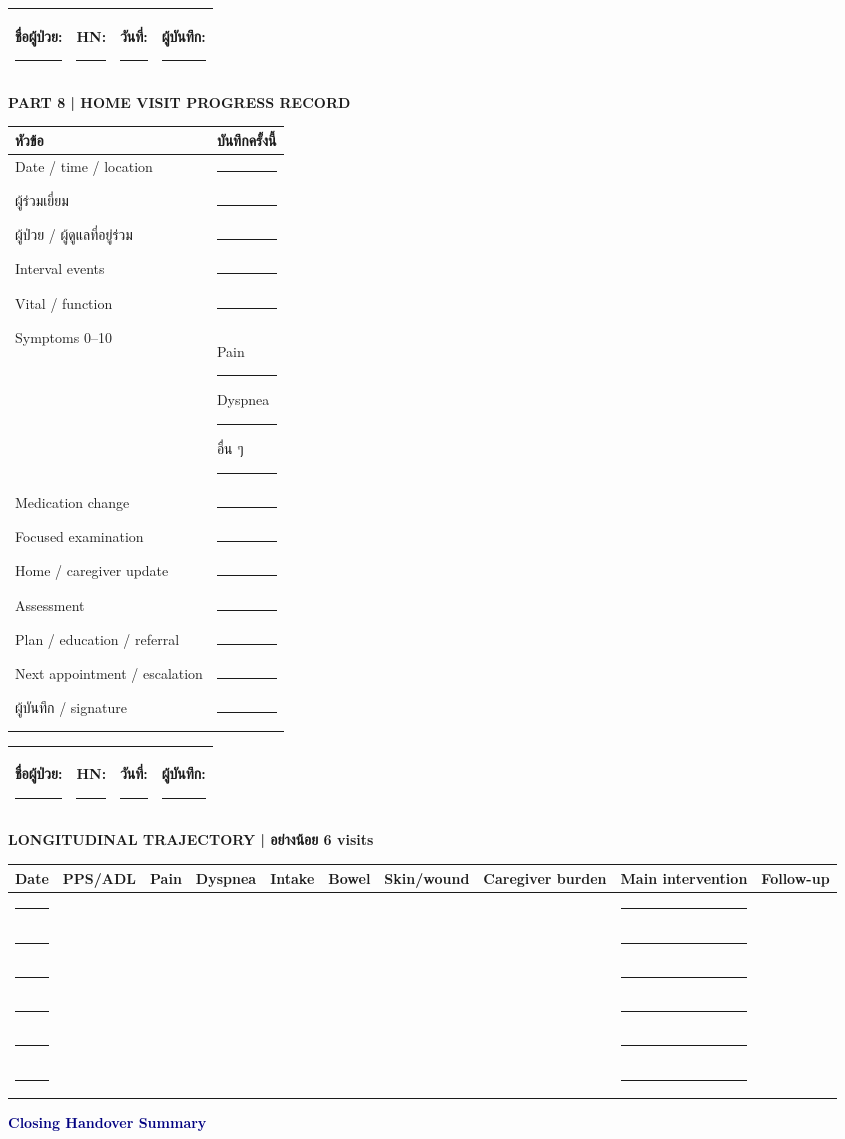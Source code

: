 \documentclass[12pt,a4paper]{article}
\newlength{\blanklen}
\newcommand{\blank}[1][4cm]{\setlength{\blanklen}{#1}\ifdim\blanklen>2cm\setlength{\blanklen}{2cm}\fi\rule{\blanklen}{0.4pt}}
\newcommand{\patientline}{\begin{tabularx}{\textwidth}{|X|X|X|X|}\hline ชื่อผู้ป่วย: \blank[2.8cm] & HN: \blank[1.4cm] & วันที่: \blank[1.4cm] & ผู้บันทึก: \blank[1.5cm]\\\hline\end{tabularx}\vspace{3pt}}
\newcommand{\sectiontitle}[1]{\vspace{4pt}\begin{tcolorbox}[colback=navy,colframe=navy,boxrule=0pt,arc=1pt,left=5pt,right=5pt,top=3pt,bottom=3pt]\color{white}\large\textbf{#1}\end{tcolorbox}}
\newcommand{\sub}[1]{\par\vspace{3pt}\noindent\textcolor{navy}{\large\textbf{#1}}\par\vspace{1pt}}
\newcommand{\lines}[1]{\begin{tcolorbox}[colback=white,colframe=gray!55,boxrule=0.4pt,arc=1pt,height=#1]\ \end{tcolorbox}}
\begin{document}
\newpage\patientline\sectiontitle{PART 8 | HOME VISIT PROGRESS RECORD}\begin{tabularx}{\textwidth}{|p{}|X|}\hline\rowcolor{navy}\color{white}หัวข้อ&\color{white}บันทึกครั้งนี้\\\hline Date / time / location&\blank[10cm]\\\hline ผู้ร่วมเยี่ยม&\blank[10cm]\\\hline ผู้ป่วย / ผู้ดูแลที่อยู่ร่วม&\blank[10cm]\\\hline Interval events&\blank[10cm]\\\hline Vital / function&\blank[10cm]\\\hline Symptoms 0--10&Pain \blank[1cm] Dyspnea \blank[1cm] อื่น ๆ \blank[4cm]\\\hline Medication change&\blank[10cm]\\\hline Focused examination&\blank[10cm]\\\hline Home / caregiver update&\blank[10cm]\\\hline Assessment&\blank[10cm]\\\hline Plan / education / referral&\blank[10cm]\\\hline Next appointment / escalation&\blank[10cm]\\\hline ผู้บันทึก / signature&\blank[10cm]\\\hline\end{tabularx}
\newpage\patientline\sectiontitle{LONGITUDINAL TRAJECTORY | อย่างน้อย 6 visits}\small\begin{tabularx}{\textwidth}{|c|c|c|c|c|c|c|c|X|c|}\hline\rowcolor{navy}\color{white}Date&\color{white}PPS/ADL&\color{white}Pain&\color{white}Dyspnea&\color{white}Intake&\color{white}Bowel&\color{white}Skin/wound&\color{white}Caregiver burden&\color{white}Main intervention&\color{white}Follow-up\\\hline\blank[.9cm]& & & & & & & &\blank[2.8cm]&\\\hline\blank[.9cm]& & & & & & & &\blank[2.8cm]&\\\hline\blank[.9cm]& & & & & & & &\blank[2.8cm]&\\\hline\blank[.9cm]& & & & & & & &\blank[2.8cm]&\\\hline\blank[.9cm]& & & & & & & &\blank[2.8cm]&\\\hline\blank[.9cm]& & & & & & & &\blank[2.8cm]&\\\hline\end{tabularx}\normalsize\sub{Closing Handover Summary}\lines{7cm}
\end{document}
